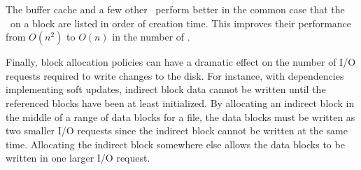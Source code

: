 
The buffer cache and a few other \modules\ perform better in the
common case that the \patches\ on a block are listed in order of creation
time.
%
This improves their performance from $O(n^2)$ to $O(n)$ in the number of
\patches.

Finally, block allocation policies can have a dramatic effect on the number of
I/O requests required to write changes to the disk. For instance, with
dependencies implementing soft updates, indirect block data cannot be written
until the referenced blocks have been at least initialized. By allocating an
indirect block in the middle of a range of data blocks for a file, the data
blocks must be written as two smaller I/O requests since the indirect block
cannot be written at the same time. Allocating the indirect block somewhere
else allows the data blocks to be written in one larger I/O request.


\begin{comment}
Several functions in \Kudos\ iterate over lists of \patches\ looking for either
a single \patch\ or set of \patches\ satisfying some property, or trying to
process all the \patches\ in the list in some order determined by the dependency
graph. It is generally the case that the \patches\ satisfying the property or
the order in which the \patches\ should be processed can be determined very
quickly by keeping the lists sorted. For instance, the library function which
rolls \patches\ back needs to perform the rollbacks essentially in inverse
creation order, so that rolling back a \patch\ which has since been overwritten
by a later \patch\ does the right thing. Keeping the list of all \patches\ on a
block sorted in creation order (which is very easy) makes this an efficient
operation, while it might otherwise take $O(n^2)$ time to execute. Similarly,
many \patch\ merging functions need to find for a given block some \patch\
which has no \befores\ on the same block, and the oldest \patch\ on a block
always satisfies this requirement.
\end{comment}
